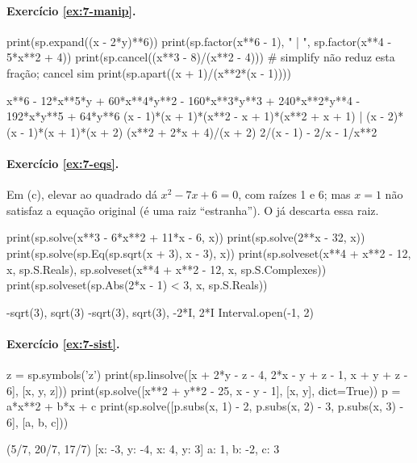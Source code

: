 \paragraph{Exercício \ref{ex:7-manip}.}
\begin{entrada}
print(sp.expand((x - 2*y)**6))
print(sp.factor(x**6 - 1), "  |  ", sp.factor(x**4 - 5*x**2 + 4))
print(sp.cancel((x**3 - 8)/(x**2 - 4)))     # simplify não reduz esta fração; cancel sim
print(sp.apart((x + 1)/(x**2*(x - 1))))
\end{entrada}
\begin{saida}
x**6 - 12*x**5*y + 60*x**4*y**2 - 160*x**3*y**3 + 240*x**2*y**4 - 192*x*y**5 + 64*y**6
(x - 1)*(x + 1)*(x**2 - x + 1)*(x**2 + x + 1)   |   (x - 2)*(x - 1)*(x + 1)*(x + 2)
(x**2 + 2*x + 4)/(x + 2)
2/(x - 1) - 2/x - 1/x**2
\end{saida}

\paragraph{Exercício \ref{ex:7-eqs}.} Em (c), elevar ao quadrado dá $x^2-7x+6=0$, com raízes 1 e 6; mas $x=1$ não
satisfaz a equação original (é uma raiz ``estranha''). O  já descarta essa raiz.
\begin{entrada}
print(sp.solve(x**3 - 6*x**2 + 11*x - 6, x))
print(sp.solve(2**x - 32, x))
print(sp.solve(sp.Eq(sp.sqrt(x + 3), x - 3), x))
print(sp.solveset(x**4 + x**2 - 12, x, sp.S.Reals), sp.solveset(x**4 + x**2 - 12, x, sp.S.Complexes))
print(sp.solveset(sp.Abs(2*x - 1) < 3, x, sp.S.Reals))
\end{entrada}
\begin{saida}
[1, 2, 3]
[5]
[6]
{-sqrt(3), sqrt(3)} {-sqrt(3), sqrt(3), -2*I, 2*I}
Interval.open(-1, 2)
\end{saida}

\paragraph{Exercício \ref{ex:7-sist}.}
\begin{entrada}
z = sp.symbols('z')
print(sp.linsolve([x + 2*y - z - 4, 2*x - y + z - 1, x + y + z - 6], [x, y, z]))
print(sp.solve([x**2 + y**2 - 25, x - y - 1], [x, y], dict=True))
p = a*x**2 + b*x + c
print(sp.solve([p.subs(x, 1) - 2, p.subs(x, 2) - 3, p.subs(x, 3) - 6], [a, b, c]))
\end{entrada}
\begin{saida}
{(5/7, 20/7, 17/7)}
[{x: -3, y: -4}, {x: 4, y: 3}]
{a: 1, b: -2, c: 3}
\end{saida}

